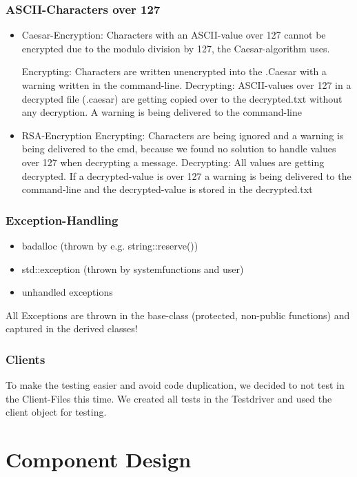 \subsubsection{ASCII-Characters over 127}
\begin{itemize}
	\item Caesar-Encryption:	Characters with an ASCII-value over 127 cannot be encrypted due to the modulo division by 127, the Caesar-algorithm uses.	
	
	\subitem Encrypting: Characters are written unencrypted into the .Caesar with a warning written 
	\subitem in the command-line. 
	\subitem Decrypting: ASCII-values over 127 in a decrypted file (.caesar) are getting copied over to the decrypted.txt without any decryption. 
			A warning is being delivered to the command-line

	\item RSA-Encryption
	\subitem Encrypting: Characters are being ignored and a warning is being delivered to the cmd, because we found no solution 
		to handle values over 127 when decrypting a message. 
	\subitem Decrypting: All values are getting decrypted. If a decrypted-value is over 127 a warning is being delivered to 
		the command-line and the decrypted-value is stored in the decrypted.txt

\end{itemize}

\subsubsection{Exception-Handling}
\begin{itemize}
	\item badalloc (thrown by e.g. string::reserve())
	\item std::exception (thrown by systemfunctions and user)
	\item unhandled exceptions
\end{itemize}
All Exceptions are thrown in the base-class (protected, non-public functions) and captured in the derived classes!

\subsubsection{Clients}
 To make the testing easier and avoid code duplication, we decided to not test in the Client-Files this time. We created all tests in the Testdriver and used the client object for testing.
	
\section{Component Design}

